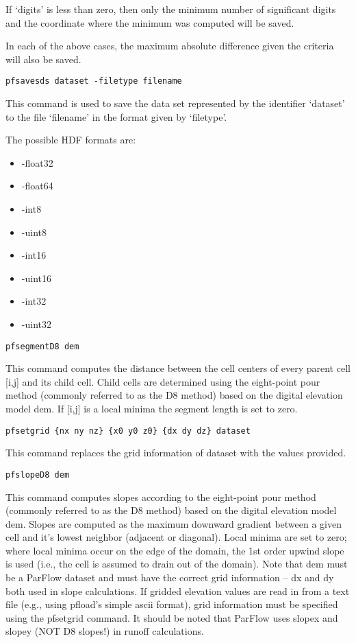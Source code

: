 \begin{description}
If `digits' is less than zero, then only the minimum number of
significant digits and the coordinate where the minimum was
computed will be saved.

In each of the above cases, the maximum absolute difference given
the criteria will also be saved.


\item{\begin{verbatim}pfsavesds dataset -filetype filename\end{verbatim}}
This command is used to save the data set represented by the
identifier `dataset' to the file `filename' in the format given by
`filetype'.

The possible HDF formats are:
\begin{itemize}
\item{-float32}
\item{-float64}
\item{-int8}
\item{-uint8}
\item{-int16}
\item{-uint16}
\item{-int32}
\item{-uint32}
\end{itemize}


\item{\begin{verbatim}pfsegmentD8 dem\end{verbatim}}
This command computes the distance between the cell centers of every parent cell [i,j]
and its child cell. Child cells are determined using the eight-point pour method (commonly
referred to as the D8 method) based on the digital elevation model dem. If [i,j] is a
local minima the segment length is set to zero.

\item{\begin{verbatim}pfsetgrid {nx ny nz} {x0 y0 z0} {dx dy dz} dataset\end{verbatim}}
This command replaces the grid information of dataset with the values provided.

\item{\begin{verbatim}pfslopeD8 dem\end{verbatim}}
This command computes slopes according to the eight-point pour method (commonly
referred to as the D8 method) based on the digital elevation model dem. Slopes
are computed as the maximum downward gradient between a given cell and it's lowest
neighbor (adjacent or diagonal). Local minima are set to zero; where local minima
occur on the edge of the domain, the 1st order upwind slope is used (i.e., the cell
is assumed to drain out of the domain). Note that dem must be a ParFlow dataset and
must have the correct grid information -- dx and dy both used in slope calculations.
If gridded elevation values are read in from a text file (e.g., using pfload's simple
ascii format), grid information must be specified using the pfsetgrid command. It should be noted that ParFlow uses slopex and slopey (NOT D8 slopes!) in runoff calculations.



\end{description}
